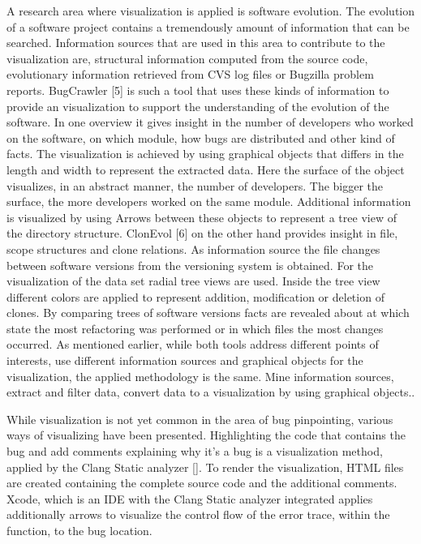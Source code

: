 A research area where visualization is applied is software evolution. The evolution of a software project contains a tremendously amount of information that can be searched. Information sources that are used in this area to contribute to the visualization are, structural information computed from the source code, evolutionary information retrieved from CVS log files or Bugzilla problem reports. BugCrawler [5] is such a tool that uses these kinds of information to provide an visualization to support the understanding of the evolution of the software. In one overview it gives insight in the number of developers who worked on the software, on which module, how bugs are distributed and other kind of facts. The visualization is achieved by using graphical objects that differs in the length and width to represent the extracted data. Here the surface of the object visualizes, in an abstract manner, the number of developers. The bigger the surface, the more developers worked on the same module.  Additional information is visualized by using Arrows between these objects to represent a tree view of the directory structure.
ClonEvol [6] on the other hand provides insight in file, scope structures and clone relations. As information source the file changes between software versions from the versioning system is obtained. For the visualization of the data set radial tree views are used. Inside the tree view different colors are applied to represent addition, modification or deletion of clones. By comparing trees of software versions facts are revealed about at which state the most refactoring was performed or in which files the most changes occurred. As mentioned earlier, while both tools address different points of interests, use different information sources and graphical objects for the visualization, the applied methodology is the same. Mine information sources, extract and filter data, convert data to a visualization by using graphical objects..

While visualization is not yet common in the area of bug pinpointing, various ways of visualizing have been presented. Highlighting the code that contains the bug and add comments explaining why it’s a bug is a visualization method, applied by the Clang Static analyzer []. To render the visualization, HTML files are created containing the complete source code and the additional comments. Xcode, which is an IDE with the Clang Static analyzer integrated applies additionally arrows to visualize the control flow of the error trace, within the function, to the bug location.

